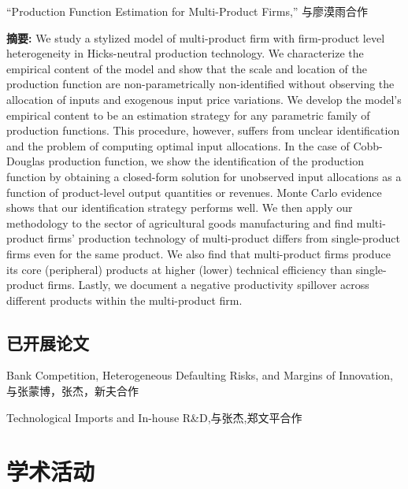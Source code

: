 \documentclass[letterpaper]{article}
\begin{document}
{    
 \vspace{0.05in}  
 “Production Function Estimation for Multi-Product Firms,” 与廖漠雨合作
     \vspace{0.05in}
 \begin{center}
 \begin{minipage}{0.9\linewidth}
   \textbf{摘要:} We study a stylized model of multi-product firm with firm-product level heterogeneity in Hicks-neutral production technology. We characterize the empirical content of the model and show that the scale and location of the production function are non-parametrically non-identified without observing the allocation of inputs and exogenous input price variations. We develop the model's empirical content to be an estimation strategy for any parametric family of production functions. This procedure, however, suffers from unclear identification and the problem of computing optimal input allocations. In the case of Cobb-Douglas production function, we show the identification of the production function by obtaining a closed-form solution for unobserved input allocations as a function of product-level output quantities or revenues. Monte Carlo evidence shows that our identification strategy performs well. We then apply our methodology to the sector of agricultural goods manufacturing and find multi-product firms' production technology of multi-product differs from single-product firms even for the same product. We also find that multi-product firms produce its core (peripheral) products at higher (lower) technical efficiency than single-product firms. Lastly, we document a negative productivity spillover across different products within the multi-product firm.  
 \end{minipage}
 \end{center}
  \vspace{0.05in}



\subsection*{\bf{已开展论文}} 
 Bank Competition, Heterogeneous Defaulting Risks, and Margins of Innovation, 与张蒙博，张杰，新夫合作


\vspace{0.5em}
Technological Imports and In-house R\&D,与张杰,郑文平合作

\section*{\textsc{学术活动}}

}
\end{document}
